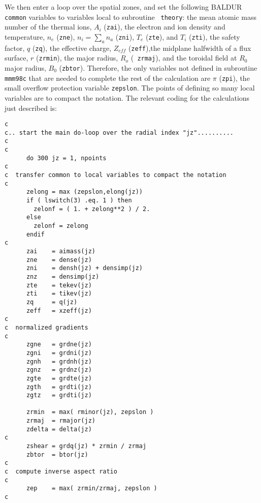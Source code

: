 We then enter a loop over the spatial zones, and set the following
BALDUR {\tt common} variables to variables local to subroutine {\tt
theory}: the mean atomic mass number of the thermal ions, $A_{i}$
({\tt zai}), the electron and ion density and temperature, $n_{e}$
({\tt zne}), $n_{i}=\sum_{a}n_{a}$ ({\tt zni}), $T_{e}$ ({\tt zte}),
and $T_{i}$ ({\tt zti}), the safety factor, $q$ ({\tt zq}), the
effective charge, $Z_{eff}$ ({\tt zeff}),the midplane halfwidth of a
flux surface, $r$ ({\tt zrmin}), the major radius, $R_{o}$ ({\tt
zrmaj}), and the toroidal field at $R_0$ major radius, $B_{0}$
({\tt zbtor}).  Therefore, the only variables not defined in
subroutine {\tt mmm98c} that are needed to complete the rest of the
calculation are $\pi$ ({\tt zpi}), the small overflow protection
variable {\tt zepslon}.  The points of defining so many local
variables are to compact the notation.  The relevant coding for the
calculations just described is:

\begin{verbatim}
c
c.. start the main do-loop over the radial index "jz"..........
c
c
      do 300 jz = 1, npoints
c
c  transfer common to local variables to compact the notation
c
      zelong = max (zepslon,elong(jz))
      if ( lswitch(3) .eq. 1 ) then
        zelonf = ( 1. + zelong**2 ) / 2.
      else
        zelonf = zelong
      endif
c
      zai    = aimass(jz)
      zne    = dense(jz)
      zni    = densh(jz) + densimp(jz)
      znz    = densimp(jz)
      zte    = tekev(jz)
      zti    = tikev(jz)
      zq     = q(jz)
      zeff   = xzeff(jz)
c
c  normalized gradients
c
      zgne   = grdne(jz)
      zgni   = grdni(jz)
      zgnh   = grdnh(jz)
      zgnz   = grdnz(jz)
      zgte   = grdte(jz)
      zgth   = grdti(jz)
      zgtz   = grdti(jz)

      zrmin  = max( rminor(jz), zepslon )
      zrmaj  = rmajor(jz)
      zdelta = delta(jz)
c
      zshear = grdq(jz) * zrmin / zrmaj
      zbtor  = btor(jz)
c
c  compute inverse aspect ratio
c
      zep    = max( zrmin/zrmaj, zepslon )
c
\end{verbatim}

